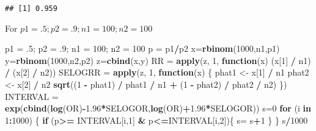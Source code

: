\documentclass[]{article}
\newenvironment{Shaded}{\begin{snugshade}}{\end{snugshade}}
\newcommand{\KeywordTok}[1]{\textcolor[rgb]{0.13,0.29,0.53}{\textbf{#1}}}
\newcommand{\DecValTok}[1]{\textcolor[rgb]{0.00,0.00,0.81}{#1}}
\newcommand{\FloatTok}[1]{\textcolor[rgb]{0.00,0.00,0.81}{#1}}
\newcommand{\StringTok}[1]{\textcolor[rgb]{0.31,0.60,0.02}{#1}}
\newcommand{\ControlFlowTok}[1]{\textcolor[rgb]{0.13,0.29,0.53}{\textbf{#1}}}
\newcommand{\OperatorTok}[1]{\textcolor[rgb]{0.81,0.36,0.00}{\textbf{#1}}}
\newcommand{\NormalTok}[1]{#1}
\begin{document}
\begin{verbatim}
## [1] 0.959
\end{verbatim}

For \(p1 = .5; p2 = .9; n1 = 100; n2 = 100\)

\begin{Shaded}
\begin{Highlighting}[]
\NormalTok{p1 =}\StringTok{ }\NormalTok{.}\DecValTok{5}\NormalTok{; p2 =}\StringTok{ }\NormalTok{.}\DecValTok{9}\NormalTok{; n1 =}\StringTok{ }\DecValTok{100}\NormalTok{; n2 =}\StringTok{ }\DecValTok{100}
\NormalTok{p =}\StringTok{ }\NormalTok{p1}\OperatorTok{/}\NormalTok{p2}
\NormalTok{x=}\KeywordTok{rbinom}\NormalTok{(}\DecValTok{1000}\NormalTok{,n1,p1)}
\NormalTok{y=}\KeywordTok{rbinom}\NormalTok{(}\DecValTok{1000}\NormalTok{,n2,p2)}
\NormalTok{z=}\KeywordTok{cbind}\NormalTok{(x,y)}
\NormalTok{RR =}\StringTok{ }\KeywordTok{apply}\NormalTok{(z, }\DecValTok{1}\NormalTok{,}
\ControlFlowTok{function}\NormalTok{(x) (x[}\DecValTok{1}\NormalTok{] }\OperatorTok{/}\StringTok{ }\NormalTok{n1) }\OperatorTok{/}\StringTok{ }\NormalTok{(x[}\DecValTok{2}\NormalTok{] }\OperatorTok{/}\StringTok{ }\NormalTok{n2))}
\NormalTok{SELOGRR =}\StringTok{ }\KeywordTok{apply}\NormalTok{(z, }\DecValTok{1}\NormalTok{,}
\ControlFlowTok{function}\NormalTok{(x) \{}
\NormalTok{phat1 <-}\StringTok{ }\NormalTok{x[}\DecValTok{1}\NormalTok{] }\OperatorTok{/}\StringTok{ }\NormalTok{n1}
\NormalTok{phat2 <-}\StringTok{ }\NormalTok{x[}\DecValTok{2}\NormalTok{] }\OperatorTok{/}\StringTok{ }\NormalTok{n2}
\KeywordTok{sqrt}\NormalTok{((}\DecValTok{1} \OperatorTok{-}\StringTok{ }\NormalTok{phat1) }\OperatorTok{/}\StringTok{ }\NormalTok{phat1 }\OperatorTok{/}\StringTok{ }\NormalTok{n1 }\OperatorTok{+}\StringTok{ }\NormalTok{(}\DecValTok{1} \OperatorTok{-}\StringTok{ }\NormalTok{phat2) }\OperatorTok{/}\StringTok{ }\NormalTok{phat2 }\OperatorTok{/}\StringTok{ }\NormalTok{n2)}
\NormalTok{\})}
\NormalTok{INTERVAL =}\StringTok{ }\KeywordTok{exp}\NormalTok{(}\KeywordTok{cbind}\NormalTok{(}\KeywordTok{log}\NormalTok{(OR)}\OperatorTok{-}\FloatTok{1.96}\OperatorTok{*}\NormalTok{SELOGOR,}\KeywordTok{log}\NormalTok{(OR)}\OperatorTok{+}\FloatTok{1.96}\OperatorTok{*}\NormalTok{SELOGOR))}
\NormalTok{s=}\DecValTok{0}
\ControlFlowTok{for}\NormalTok{ (i }\ControlFlowTok{in} \DecValTok{1}\OperatorTok{:}\DecValTok{1000}\NormalTok{) \{}
  \ControlFlowTok{if}\NormalTok{ (p}\OperatorTok{>=}\StringTok{ }\NormalTok{INTERVAL[i,}\DecValTok{1}\NormalTok{] }\OperatorTok{&}\StringTok{ }\NormalTok{p}\OperatorTok{<=}\NormalTok{INTERVAL[i,}\DecValTok{2}\NormalTok{])\{}
\NormalTok{    s=}\StringTok{ }\NormalTok{s}\OperatorTok{+}\DecValTok{1}
\NormalTok{  \}}
\NormalTok{\}}
\NormalTok{s}\OperatorTok{/}\DecValTok{1000}
\end{Highlighting}
\end{Shaded}
\end{document}
